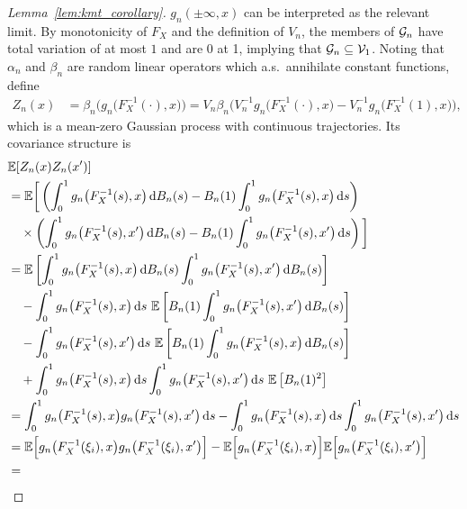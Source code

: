 \begin{proof}[Lemma~\ref{lem:kmt_corollary}]
  $g_n(\pm \infty, x)$
  can be interpreted as
  the relevant limit.
  By monotonicity of $F_X$ and the definition of $V_n$,
  the members of $\mathcal{G}_n$ have total variation of at most $1$
  and are 0 at 1, implying that
  $\mathcal{G}_n \subseteq \mathcal{V}_1$.
  Noting that $\alpha_n$ and $\beta_n$ are random
  linear operators which a.s.\ annihilate
  constant functions,
  define
  \begin{align*}
    Z_n(x)
    &=
    \beta_n \Big(g_n\big(F_X^{-1}(\cdot), x\big)\Big)
    = V_n \beta_n \Big(
    V_n^{-1} g_n\big(F_X^{-1}(\cdot), x\big)
    - V_n^{-1} g_n\big(F_X^{-1}(1), x\big)
    \Big),
  \end{align*}
  which is a mean-zero Gaussian process with continuous trajectories.
  Its covariance structure is
  \begin{align*}
    &\E[Z_n(x) Z_n(x')] \\
    &=
    \E\bigg[
      \left(
        \int_0^1 g_n\big(F_X^{-1}(s),x\big) \diff{B_n(s)}
        - B_n(1) \int_0^1 g_n\big(F_X^{-1}(s),x\big) \diff{s}
      \right) \\
      &\quad\times
      \left(
        \int_0^1 g_n\big(F_X^{-1}(s),x'\big) \diff{B_n(s)}
        - B_n(1) \int_0^1 g_n\big(F_X^{-1}(s),x'\big) \diff{s}
      \right)
      \bigg] \\
    &=
    \E\left[
      \int_0^1 g_n\big(F_X^{-1}(s),x\big) \diff{B_n(s)}
      \int_0^1 g_n\big(F_X^{-1}(s),x'\big) \diff{B_n(s)}
    \right] \\
    &\quad- \int_0^1 g_n\big(F_X^{-1}(s),x\big) \diff{s} \
    \E\left[
      B_n(1) \int_0^1 g_n\big(F_X^{-1}(s),x'\big) \diff{B_n(s)}
    \right] \\
    &\quad-
    \int_0^1 g_n\big(F_X^{-1}(s),x'\big) \diff{s} \
    \E\left[
      B_n(1) \int_0^1 g_n\big(F_X^{-1}(s),x\big) \diff{B_n(s)}
    \right] \\
    &\quad+
    \int_0^1 g_n\big(F_X^{-1}(s),x\big) \diff{s}
    \int_0^1 g_n\big(F_X^{-1}(s),x'\big) \diff{s} \
    \E\left[
      B_n(1)^2
    \right] \\
    &=
    \int_0^1 g_n\big(F_X^{-1}(s),x\big)
    g_n\big(F_X^{-1}(s),x'\big) \diff{s}
    - \int_0^1 g_n\big(F_X^{-1}(s),x\big) \diff{s}
    \int_0^1 g_n\big(F_X^{-1}(s),x'\big) \diff{s} \\
    &=
    \E\Big[
    g_n\big(F_X^{-1}(\xi_i), x\big)
    g_n\big(F_X^{-1}(\xi_i), x'\big)
    \Big]
    - \E\Big[
    g_n\big(F_X^{-1}(\xi_i), x\big)
    \Big]
    \E\Big[
    g_n\big(F_X^{-1}(\xi_i), x'\big)
    \Big] \\
    &=

\end{align*}
\end{proof}
